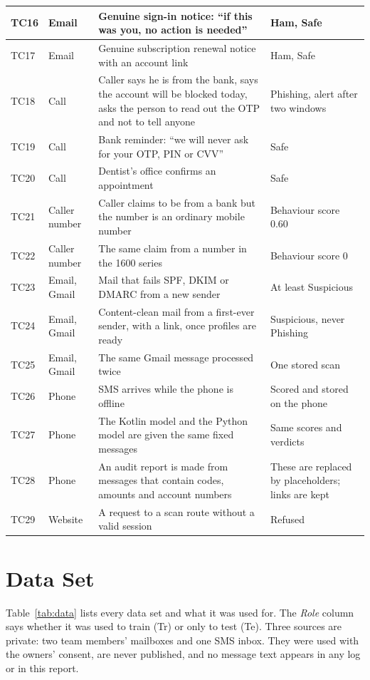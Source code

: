 {{\begin{longtable}{|p{1.1cm}|p{1.7cm}|p{6.9cm}|p{4.3cm}|}
TC16 & Email & Genuine sign-in notice: ``if this was you, no action is needed'' & Ham, Safe \\ \hline
TC17 & Email & Genuine subscription renewal notice with an account link & Ham, Safe \\ \hline
TC18 & Call & Caller says he is from the bank, says the account will be blocked today, asks the person to read out the OTP and not to tell anyone & Phishing, alert after two windows \\ \hline
TC19 & Call & Bank reminder: ``we will never ask for your OTP, PIN or CVV'' & Safe \\ \hline
TC20 & Call & Dentist's office confirms an appointment & Safe \\ \hline
TC21 & Caller number & Caller claims to be from a bank but the number is an ordinary mobile number & Behaviour score 0.60 \\ \hline
TC22 & Caller number & The same claim from a number in the 1600 series & Behaviour score 0 \\ \hline
TC23 & Email, Gmail & Mail that fails SPF, DKIM or DMARC from a new sender & At least Suspicious \\ \hline
TC24 & Email, Gmail & Content-clean mail from a first-ever sender, with a link, once profiles are ready & Suspicious, never Phishing \\ \hline
TC25 & Email, Gmail & The same Gmail message processed twice & One stored scan \\ \hline
TC26 & Phone & SMS arrives while the phone is offline & Scored and stored on the phone \\ \hline
TC27 & Phone & The Kotlin model and the Python model are given the same fixed messages & Same scores and verdicts \\ \hline
TC28 & Phone & An audit report is made from messages that contain codes, amounts and account numbers & These are replaced by placeholders; links are kept \\ \hline
TC29 & Website & A request to a scan route without a valid session & Refused \\ \hline
\end{longtable}
}

\section{Data Set}\label{sec:dataset}
Table~\ref{tab:data} lists every data set and what it was used for. The \emph{Role} column says whether it was used to train (Tr) or only to test (Te). Three sources are private: two team members' mailboxes and one SMS inbox. They were used with the owners' consent, are never published, and no message text appears in any log or in this report.

}
